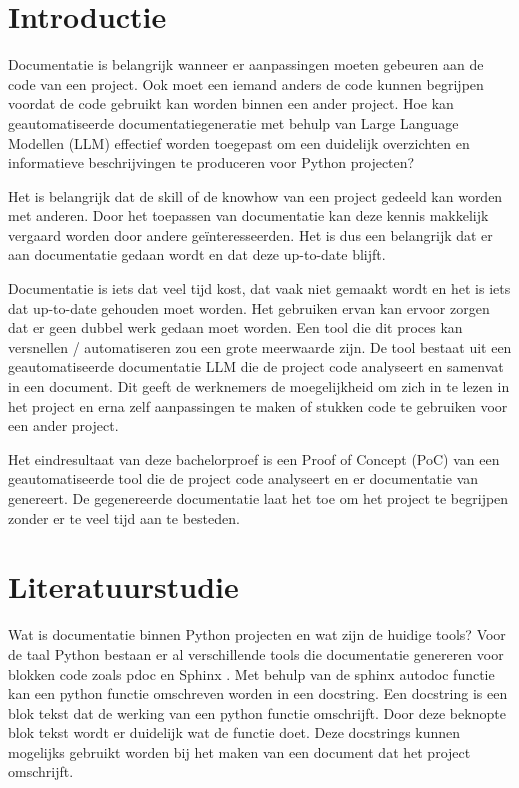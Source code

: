 
\section{Introductie}%
\label{sec:introductie}

Documentatie is belangrijk wanneer er aanpassingen moeten gebeuren aan de code van een project. Ook moet een iemand anders de code kunnen begrijpen voordat de code gebruikt kan worden binnen een ander project.
Hoe kan geautomatiseerde documentatiegeneratie met behulp van Large Language Modellen (LLM) effectief worden toegepast om een duidelijk overzichten en informatieve beschrijvingen te produceren voor Python projecten?

Het is belangrijk dat de skill of de knowhow van een project gedeeld kan worden met anderen. 
Door het toepassen van documentatie kan deze kennis makkelijk vergaard worden door andere geïnteresseerden.
Het is dus een belangrijk dat er aan documentatie gedaan wordt en dat deze up-to-date blijft. 

Documentatie is iets dat veel tijd kost, dat vaak niet gemaakt wordt en het is iets dat up-to-date gehouden moet worden.
Het gebruiken ervan kan ervoor zorgen dat er geen dubbel werk gedaan moet worden. Een tool die dit proces kan versnellen / automatiseren zou een grote meerwaarde zijn.
De tool bestaat uit een geautomatiseerde documentatie LLM die de project code analyseert en samenvat in een document. 
Dit geeft de werknemers de moegelijkheid om zich in te lezen in het project en erna zelf aanpassingen te maken of stukken code te gebruiken voor een ander project.

Het eindresultaat van deze bachelorproef is een Proof of Concept (PoC) van een geautomatiseerde tool die de project code analyseert en er documentatie van genereert.
De gegenereerde documentatie laat het toe om het project te begrijpen zonder er te veel tijd aan te besteden.


\section{Literatuurstudie}%
\label{sec:Literatuurstudie}

Wat is documentatie binnen Python projecten en wat zijn de huidige tools?
Voor de taal Python bestaan er al verschillende tools die documentatie genereren voor blokken code zoals pdoc \autocite{GallantHils2023} en Sphinx \autocite{Sphinx2023}. 
Met behulp van de sphinx autodoc functie \autocite{Sphinx2023} kan een python functie omschreven worden in een docstring.
Een docstring is een blok tekst dat de werking van een python functie omschrijft. Door deze beknopte blok tekst wordt er duidelijk wat de functie doet.
Deze docstrings kunnen mogelijks gebruikt worden bij het maken van een document dat het project omschrijft.

